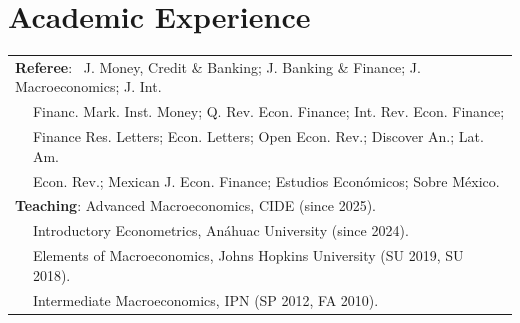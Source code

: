 \documentclass[12pt]{article}
\newcommand{\vsect}{\vspace{0.08cm}}
\begin{document}
	
	\section{Academic Experience} 
	\vsect
	\begin{tabular}{l m{15.3cm}}
		\multicolumn{2}{l}{\textbf{Referee}:  \, J. Money, Credit \& Banking; J. Banking \& Finance; J. Macroeconomics; J. Int.  } \\
		& \vspace{-0.1cm} Financ. Mark. Inst. Money; Q. Rev. Econ. Finance; Int. Rev. Econ. Finance; \\ 
		& Finance Res. Letters; Econ. Letters; Open Econ. Rev.; Discover An.; Lat. Am. \\ %
		& Econ. Rev.; Mexican J. Econ. Finance; Estudios Económicos; Sobre México. \\ 
		\multicolumn{2}{l}{\textbf{Teaching}: Advanced Macroeconomics, CIDE (since 2025).} \\ %
		& Introductory Econometrics, Anáhuac University (since 2024). \\ %
		 & Elements of Macroeconomics, Johns Hopkins University (SU 2019, SU 2018). \\
		\qquad \qquad \, & Intermediate Macroeconomics, IPN (SP 2012, FA 2010). \\ %
		
		
	\end{tabular}
	
\end{document}
